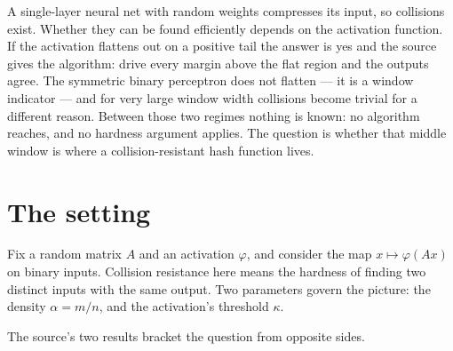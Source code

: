 \documentclass{aicr-conjecture}
\begin{document}

\vspace{0.4em}

\begin{informalconjecture}
A single-layer neural net with random weights compresses its input, so
collisions exist. Whether they can be found efficiently depends on the
activation function. If the activation flattens out on a positive tail
the answer is yes and the source gives the algorithm: drive every margin
above the flat region and the outputs agree. The symmetric binary
perceptron does not flatten --- it is a window indicator --- and for very
large window width collisions become trivial for a different reason.
Between those two regimes nothing is known: no algorithm reaches, and no
hardness argument applies. The question is whether that middle window is
where a collision-resistant hash function lives.
\end{informalconjecture}

\section{The setting}\label{sec:setting}

Fix a random matrix $A$ and an activation $\varphi$, and consider the map
$x \mapsto \varphi(Ax)$ on binary inputs. Collision resistance here means
the hardness of finding two distinct inputs with the same output. Two
parameters govern the picture: the density $\alpha = m/n$, and the
activation's threshold $\kappa$.

The source's two results bracket the question from opposite sides.
\end{document}
